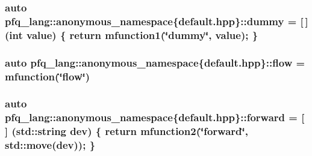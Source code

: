 \hypertarget{namespacepfq__lang_1_1anonymous__namespace_02default_8hpp_03_a876b4be1c6cf97e317f74242d8fb3da4}{
\subsubsection[{dummy}]{\setlength{\rightskip}{0pt plus 5cm}auto pfq\+\_\+lang\+::anonymous\+\_\+namespace\{default.\+hpp\}\+::dummy = \mbox{[}$\,$\mbox{]} (int value) \{ return {\bf mfunction1}(\char`\"{}dummy\char`\"{}, value); \}}}\label{namespacepfq__lang_1_1anonymous__namespace_02default_8hpp_03_a876b4be1c6cf97e317f74242d8fb3da4}
\hypertarget{namespacepfq__lang_1_1anonymous__namespace_02default_8hpp_03_a90497b962aed613834286418cd7ea722}{
\subsubsection[{flow}]{\setlength{\rightskip}{0pt plus 5cm}auto pfq\+\_\+lang\+::anonymous\+\_\+namespace\{default.\+hpp\}\+::flow = {\bf mfunction}(\char`\"{}flow\char`\"{})}}\label{namespacepfq__lang_1_1anonymous__namespace_02default_8hpp_03_a90497b962aed613834286418cd7ea722}
\hypertarget{namespacepfq__lang_1_1anonymous__namespace_02default_8hpp_03_a7fbe4b2614dd240727bf1696b4d06523}{
\subsubsection[{forward}]{\setlength{\rightskip}{0pt plus 5cm}auto pfq\+\_\+lang\+::anonymous\+\_\+namespace\{default.\+hpp\}\+::forward = \mbox{[}$\,$\mbox{]} (std\+::string dev) \{ return {\bf mfunction2}(\char`\"{}forward\char`\"{}, std\+::move(dev)); \}}}\label{namespacepfq__lang_1_1anonymous__namespace_02default_8hpp_03_a7fbe4b2614dd240727bf1696b4d06523}
